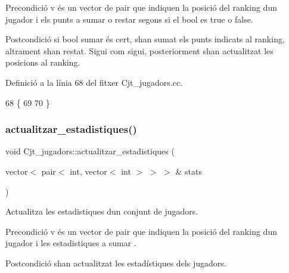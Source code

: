 \begin{DoxyPrecond}{Precondició}
v és un vector de pair que indiquen la posició del ranking d\textquotesingle{}un jugador i els punts a sumar o restar segons si el bool es true o false. 
\end{DoxyPrecond}
\begin{DoxyPostcond}{Postcondició}
si bool sumar és cert, s\textquotesingle{}han sumat els punts indicats al ranking, altrament s\textquotesingle{}han restat. Sigui com sigui, posteriorment s\textquotesingle{}han actualitzat les posicions al ranking. 
\end{DoxyPostcond}


Definició a la línia 68 del fitxer Cjt\+\_\+jugadors.\+cc.


\begin{DoxyCode}
68                                                                                  \{
69     
70 \}
\end{DoxyCode}
\mbox{\label{class_cjt__jugadors_ade2368355d0198eef0c8d06c932f1a17}} 
\subsubsection{\texorpdfstring{actualitzar\+\_\+estadistiques()}{actualitzar\_estadistiques()}}
{\footnotesize\ttfamily void Cjt\+\_\+jugadors\+::actualitzar\+\_\+estadistiques (\begin{DoxyParamCaption}\item[{vector$<$ pair$<$ int, vector$<$ int $>$ $>$ $>$ \&}]{stats }\end{DoxyParamCaption})}



Actualitza les estadistiques d\textquotesingle{}un conjunt de jugadors. 

\begin{DoxyPrecond}{Precondició}
v és un vector de pair que indiquen la posició del ranking d\textquotesingle{}un jugador i les estadistiques a sumar . 
\end{DoxyPrecond}
\begin{DoxyPostcond}{Postcondició}
s\textquotesingle{}han actualitzat les estadístiques dels jugadors. 
\end{DoxyPostcond}


